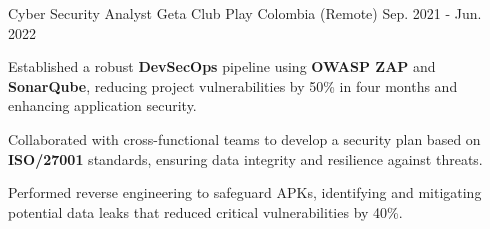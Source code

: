 \begin{cventries}
  \cventry
  {Cyber Security Analyst} %
  {Geta Club Play} %
  {Colombia (Remote)} %
  {Sep. 2021 - Jun. 2022} %
  {
    \begin{cvitems} %
      \item {Established a robust \textbf{DevSecOps} pipeline using \textbf{OWASP ZAP} and \textbf{SonarQube}, reducing project vulnerabilities by 50\% in four months and enhancing application security.}
      \item {Collaborated with cross-functional teams to develop a security plan based on \textbf{ISO/27001} standards, ensuring data integrity and resilience against threats.}
      \item {Performed reverse engineering to safeguard APKs, identifying and mitigating potential data leaks that reduced critical vulnerabilities by 40\%.}
    \end{cvitems}
  }

\end{cventries}